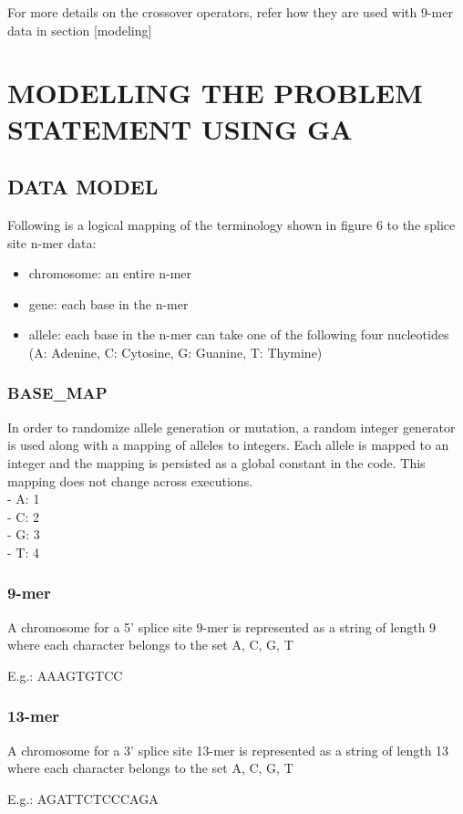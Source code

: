 \documentclass[12pt,a4paper]{article}
\begin{document}
	For more details on the crossover operators, refer how they are used with 9-mer data in section [modeling]
	
	\section{MODELLING THE PROBLEM STATEMENT USING GA}
	\subsection{DATA MODEL}
	Following is a logical mapping of the terminology shown in figure 6 to the splice site n-mer data:
	\begin{itemize}
		\item chromosome: an entire n-mer
		\item gene: each base in the n-mer
		\item allele: each base in the n-mer can take one of the following four nucleotides (A: Adenine, C: Cytosine, G: Guanine, T: Thymine)
	\end{itemize}
	
	\subsubsection{BASE\_MAP}
	In order to randomize allele generation or mutation, a random integer generator is used along with a mapping of alleles to integers. Each allele is mapped to an integer and the mapping is persisted as a global constant in the code. This mapping does not change across executions. \\
	- A: 1 \\
	- C: 2 \\
	- G: 3 \\
	- T: 4
	\subsubsection{9-mer}
	A chromosome for a 5’ splice site 9-mer is represented as a string of length 9 where each character belongs to the set {A, C, G, T} \par
	E.g.: AAAGTGTCC
	
	\subsubsection{13-mer}
	A chromosome for a 3’ splice site 13-mer is represented as a string of length 13 where each character belongs to the set {A, C, G, T} \par
	E.g.: AGATTCTCCCAGA
	
\end{document}
